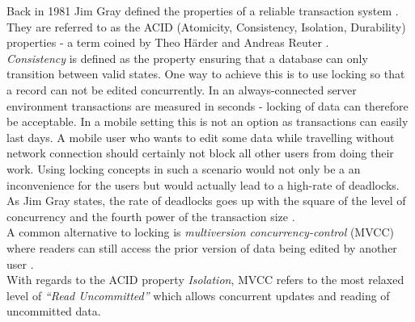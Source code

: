 Back in 1981 Jim Gray defined the properties of a reliable transaction system \cite{Gray:1981wi}.
They are referred to as the ACID (Atomicity, Consistency, Isolation, Durability) properties - a term coined by  Theo Härder and Andreas Reuter \cite{haerder1983principles}.\\
\emph{Consistency} is defined as the property ensuring that a database can only transition between valid states.
One way to achieve this is to use locking so that a record can not be edited concurrently.
In an always-connected server environment transactions are measured in seconds - locking of data can therefore be acceptable.
In a mobile setting this is not an option as transactions can easily last days.
A mobile user who wants to edit some data while travelling without network connection should certainly not block all other users from doing their work.
Using locking concepts in such a scenario would not only be a an inconvenience for the users but would actually lead to a high-rate of deadlocks.
As Jim Gray states, the rate of deadlocks goes up with the square of the level of concurrency and the fourth power of the transaction size \cite{gray1981strawman}.\\
A common alternative to locking is \emph{multiversion concurrency-control} (MVCC) where readers can still access the prior version of data being edited by another user \cite{Bernstein:1981ut}.\\
With regards to the ACID property \emph{Isolation}, MVCC refers to the most relaxed level of \emph{``Read Uncommitted''} which allows concurrent updates and reading of uncommitted data.\\

